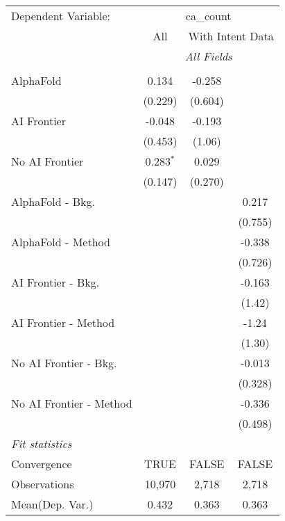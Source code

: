 \begingroup
\centering
\begin{tabular}{lccc}
   \tabularnewline \midrule \midrule
   Dependent Variable: & \multicolumn{3}{c}{ca\_count}\\
 & \multicolumn{1}{c}{All} & \multicolumn{2}{c}{With Intent Data} \\
\cmidrule(lr){2-2} \cmidrule(lr){3-4}
 & \multicolumn{3}{c}{\textit{All Fields}} \\ \\
   AlphaFold               & 0.134       & -0.258  &   \\   
                           & (0.229)     & (0.604) &   \\   
   AI Frontier             & -0.048      & -0.193  &   \\   
                           & (0.453)     & (1.06)  &   \\   
   No AI Frontier          & 0.283$^{*}$ & 0.029   &   \\   
                           & (0.147)     & (0.270) &   \\   
   AlphaFold - Bkg.        &             &         & 0.217\\   
                           &             &         & (0.755)\\   
   AlphaFold - Method      &             &         & -0.338\\   
                           &             &         & (0.726)\\   
   AI Frontier - Bkg.      &             &         & -0.163\\   
                           &             &         & (1.42)\\   
   AI Frontier - Method    &             &         & -1.24\\   
                           &             &         & (1.30)\\   
   No AI Frontier - Bkg.   &             &         & -0.013\\   
                           &             &         & (0.328)\\   
   No AI Frontier - Method &             &         & -0.336\\   
                           &             &         & (0.498)\\   
   \midrule
   \emph{Fit statistics}\\
   Convergence             &TRUE         & FALSE   & FALSE\\  
   Observations            & 10,970      & 2,718   & 2,718\\  
Mean(Dep. Var.) & 0.432 & 0.363 & 0.363 \\
   

\end{tabular}
